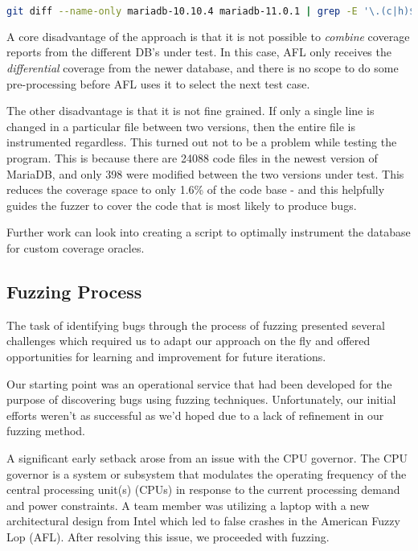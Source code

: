 \documentclass[sigconf]{acmart}
\begin{document}
\begin{lstlisting}[language=bash, caption={Whitelist File Generation}]
git diff --name-only mariadb-10.10.4 mariadb-11.0.1 | grep -E '\.(c|h)$' > whitelist.txt
\end{lstlisting}

A core disadvantage of the approach is that it is not possible to \textit{combine} coverage reports from the different DB's under test. In this case, AFL only receives the \textit{differential} coverage from the newer database, and there is no scope to do some pre-processing before AFL uses it to select the next test case. 

The other disadvantage is that it is not fine grained. If only a single line is changed in a particular file between two versions, then the entire file is instrumented regardless. This turned out not to be a problem while testing the program. This is because there are 24088 code files in the newest version of MariaDB, and only 398 were modified between the two versions under test. This reduces the coverage space to only 1.6\% of the code base - and this helpfully guides the fuzzer to cover the code that is most likely to produce bugs.

Further work can look into creating a script to optimally instrument the database for custom coverage oracles.

\subsection{Fuzzing Process}

The task of identifying bugs through the process of fuzzing presented several challenges which required us to adapt our approach on the fly and offered opportunities for learning and improvement for future iterations.

Our starting point was an operational service that had been developed for the purpose of discovering bugs using fuzzing techniques. Unfortunately, our initial efforts weren't as successful as we'd hoped due to a lack of refinement in our fuzzing method.

A significant early setback arose from an issue with the CPU governor. The CPU governor is a system or subsystem that modulates the operating frequency of the central processing unit(s) (CPUs) in response to the current processing demand and power constraints. A team member was utilizing a laptop with a new architectural design from Intel which led to false crashes in the American Fuzzy Lop (AFL). After resolving this issue, we proceeded with fuzzing.
\end{document}
